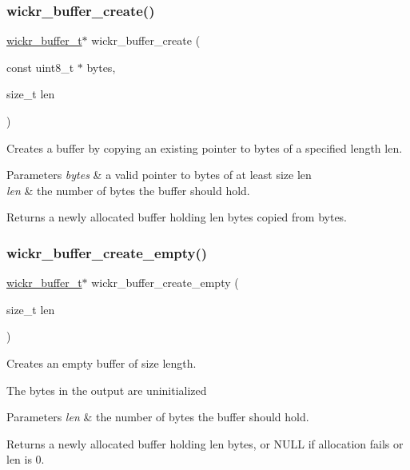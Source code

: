 \subsubsection{\texorpdfstring{wickr\_buffer\_create()}{wickr\_buffer\_create()}}
{\footnotesize\ttfamily \mbox{\hyperlink{structwickr__buffer}{wickr\+\_\+buffer\+\_\+t}}$\ast$ wickr\+\_\+buffer\+\_\+create (\begin{DoxyParamCaption}\item[{const uint8\+\_\+t $\ast$}]{bytes,  }\item[{size\+\_\+t}]{len }\end{DoxyParamCaption})}



Creates a buffer by copying an existing pointer to bytes of a specified length len. 


\begin{DoxyParams}{Parameters}
{\em bytes} & a valid pointer to bytes of at least size len \\
\hline
{\em len} & the number of bytes the buffer should hold. \\
\hline
\end{DoxyParams}
\begin{DoxyReturn}{Returns}
a newly allocated buffer holding len bytes copied from bytes. 
\end{DoxyReturn}
\mbox{\label{group__wickr__buffer_ga305edd191e38eb040710b631c1e4f05f}} 
\subsubsection{\texorpdfstring{wickr\_buffer\_create\_empty()}{wickr\_buffer\_create\_empty()}}
{\footnotesize\ttfamily \mbox{\hyperlink{structwickr__buffer}{wickr\+\_\+buffer\+\_\+t}}$\ast$ wickr\+\_\+buffer\+\_\+create\+\_\+empty (\begin{DoxyParamCaption}\item[{size\+\_\+t}]{len }\end{DoxyParamCaption})}



Creates an empty buffer of size length. 

The bytes in the output are uninitialized


\begin{DoxyParams}{Parameters}
{\em len} & the number of bytes the buffer should hold. \\
\hline
\end{DoxyParams}
\begin{DoxyReturn}{Returns}
a newly allocated buffer holding len bytes, or N\+U\+LL if allocation fails or len is 0. 
\end{DoxyReturn}
\mbox{\label{group__wickr__buffer_gaba0ae148a2f75e50eb3d36a4bef509d2}} 
